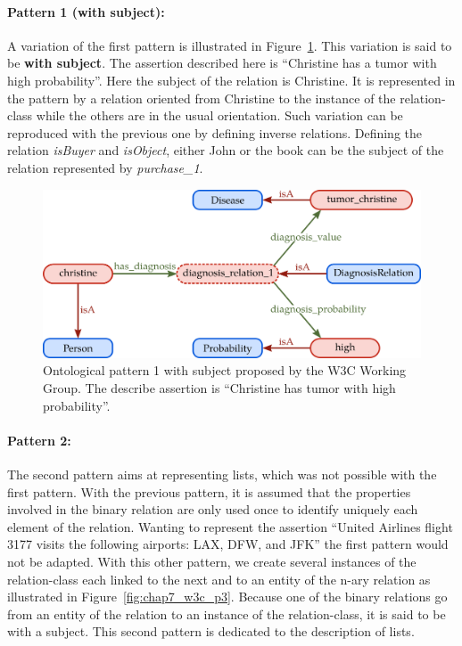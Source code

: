 \paragraph{Pattern 1 (with subject):} A variation of the first pattern is illustrated in Figure~\ref{fig:chap7_w3c_p1}. This variation is said to be \textbf{with subject}. The assertion described here is ``Christine has a tumor with high probability''. Here the subject of the relation is Christine. It is represented in the pattern by a relation oriented from Christine to the instance of the relation-class while the others are in the usual orientation. Such variation can be reproduced with the previous one by defining inverse relations. Defining the relation \textit{isBuyer} and \textit{isObject}, either John or the book can be the subject of the relation represented by \textit{purchase\_1}.

\begin{figure}[ht!]
\centering
\includegraphics[scale=0.4]{figures/chapter7/w3c_p1.png}
\caption{\label{fig:chap7_w3c_p1} Ontological pattern 1 with subject proposed by the W3C Working Group. The describe assertion is ``Christine has tumor with high probability''.}
\end{figure}

\paragraph{Pattern 2:} The second pattern aims at representing lists, which was not possible with the first pattern. With the previous pattern, it is assumed that the properties involved in the binary relation are only used once to identify uniquely each element of the relation. Wanting to represent the assertion ``United Airlines flight 3177 visits the following airports: LAX, DFW, and JFK'' the first pattern would not be adapted. With this other pattern, we create several instances of the relation-class each linked to the next and to an entity of the n-ary relation as illustrated in Figure~\ref{fig:chap7_w3c_p3}. Because one of the binary relations go from an entity of the relation to an instance of the relation-class, it is said to be with a subject. This second pattern is dedicated to the description of lists.

